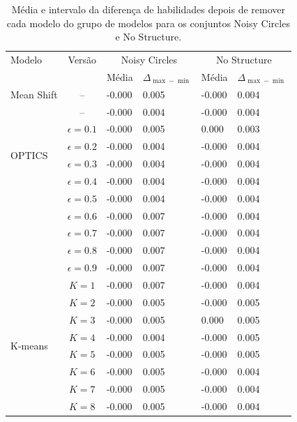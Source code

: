 \begin{table}[!t]
    \centering
    \tiny
    \caption{Média e intervalo da diferença de habilidades depois de remover cada modelo do grupo de modelos para os conjuntos Noisy Circles e No Structure.}
    \label{tab:metrics_noisy_circles_no_structure}
    \begin{tabular}{l|c|ll|ll}
    \midrule
    Modelo & Versão 
      & \multicolumn{2}{c|}{Noisy Circles} 
      & \multicolumn{2}{c}{No Structure} \\
          &        
      & Média & $\Delta_{\max-\min}$ 
      & Média & $\Delta_{\max-\min}$ \\
    \midrule
    Mean Shift      & -- & -0.000 & 0.005 & -0.000 & 0.004 \\
    \midrule
    \multirow[t]{6}{*}{OPTICS}
      & -- & -0.000 & 0.004 & -0.000 & 0.004     \\
    \midrule
    \multirow[t]{9}{*}{DBSCAN} 
      & $\epsilon=0.1$ & -0.000 & 0.005 &  0.000 & 0.003 \\
      & $\epsilon=0.2$ & -0.000 & 0.004 & -0.000 & 0.004 \\
      & $\epsilon=0.3$ & -0.000 & 0.004 & -0.000 & 0.004 \\
      & $\epsilon=0.4$ & -0.000 & 0.004 & -0.000 & 0.004 \\
      & $\epsilon=0.5$ & -0.000 & 0.004 & -0.000 & 0.004 \\
      & $\epsilon=0.6$ & -0.000 & 0.007 & -0.000 & 0.004 \\
      & $\epsilon=0.7$ & -0.000 & 0.007 & -0.000 & 0.004 \\
      & $\epsilon=0.8$ & -0.000 & 0.007 & -0.000 & 0.004 \\
      & $\epsilon=0.9$ & -0.000 & 0.007 & -0.000 & 0.004 \\
    \midrule
    \multirow[t]{8}{*}{K-means} 
      & $K=1$ & -0.000 & 0.007 & -0.000 & 0.004 \\
      & $K=2$ & -0.000 & 0.005 & -0.000 & 0.005 \\
      & $K=3$ & -0.000 & 0.005 &  0.000 & 0.005 \\
      & $K=4$ & -0.000 & 0.004 & -0.000 & 0.005 \\
      & $K=5$ & -0.000 & 0.005 & -0.000 & 0.005 \\
      & $K=6$ & -0.000 & 0.005 & -0.000 & 0.004 \\
      & $K=7$ & -0.000 & 0.005 & -0.000 & 0.004 \\
      & $K=8$ & -0.000 & 0.005 & -0.000 & 0.004 \\

\end{tabular}
\end{table}
